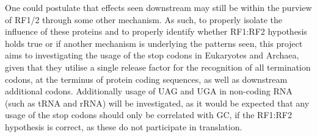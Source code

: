 \documentclass[../main.tex]{subfile}
\begin{document}
    One could postulate that effects seen downstream may still be within the purview of RF1/2 through some other mechanism. As such, to properly isolate the influence of these proteins and to properly identify whether RF1:RF2 hypothesis holds true or if another mechanism is underlying the patterns seen, this project aims to investigating the usage of the stop codons in Eukaryotes and Archaea, given that they utilise a single release factor for the recognition of all termination codons, at the terminus of protein coding sequences, as well as downstream additional codons. Additionally usage of UAG and UGA in non-coding RNA (such as tRNA and rRNA) will be investigated, as it would be expected that any usage of the stop codons should only be correlated with GC, if the RF1:RF2 hypothesis is correct, as these do not participate in translation.
\end{document}
